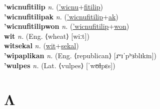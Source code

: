 \textbf{'wicnufitilip} \textit{n.} (\hyperref['wicnu]{'wicnu}+\hyperref[fitilip]{fitilip})
 \label{'wicnufitilip} \\
\textbf{'wicnufitilipak} \textit{n.} (\hyperref['wicnufitilip]{'wicnufitilip}+\hyperref[ak]{ak})
 \label{'wicnufitilipak} \\
\textbf{'wicnufitilipwon} \textit{n.} (\hyperref['wicnufitilip]{'wicnufitilip}+\hyperref[won]{won})
 \label{'wicnufitilipwon} \\
\textbf{wit} \textit{n.} (Eng. ⟨wheat⟩ [wiːt])
 \label{wit} \\
\textbf{witsekal} \textit{n.} (\hyperref[wit]{wit}+\hyperref[sekal]{sekal})
 \label{witsekal} \\
\textbf{'wipaplikan} \textit{n.} (Eng. ⟨republican⟩ [ɹʷɪˈpʰɜblɪkɪn])
 \label{'wipaplikan} \\
\textbf{'wulpes} \textit{n.} (Lat. ⟨vulpes⟩ [ˈwʊɫpɛs])
 \label{'wulpes} 

\section{Λ}

